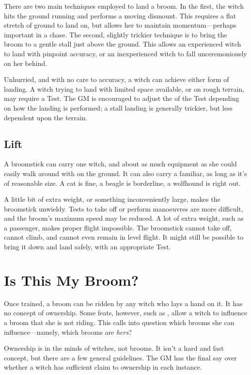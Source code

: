 There are two main techniques employed to land a broom.
In the first, the witch hits the ground running and performs a moving dismount.
This requires a flat stretch of ground to land on, but allows her to maintain momentum---perhaps important in a chase.
The second, slightly trickier technique is to bring the broom to a gentle stall just above the ground.
This allows an experienced witch to land with pinpoint accuracy, or an inexperienced witch to fall unceremoniously on her behind.

Unhurried, and with no care to accuracy, a witch can achieve either form of landing.
A witch trying to land with limited space available, or on rough terrain, may require a Test.
The GM is encouraged to adjust the {\tn} of the Test depending on how the landing is performed; a stall landing is generally trickier, but less dependent upon the terrain.

\subsection{Lift}

A broomstick can carry one witch, and about as much equipment as she could easily walk around with on the ground.
It can also carry a familiar, as long as it's of reasonable size.
A cat is fine, a beagle is borderline, a wolfhound is right out.

A little bit of extra weight, or something inconveniently large, makes the broomstick unwieldy.
Tests to take off or perform manoeuvres are more difficult, and the broom's maximum speed may be reduced.
A lot of extra weight, such as a passenger, makes proper flight impossible.
The broomstick cannot take off, cannot climb, and cannot even remain in level flight.
It might still be possible to bring it down and land safely, with an appropriate Test.



\section{Is This My Broom?}

Once trained, a broom can be ridden by any witch who lays a hand on it.
It has no concept of ownership.
Some feats, however, such as , allow a witch to influence a broom that she is not riding.
This calls into question which brooms she can influence---namely, which brooms are \emph{hers}?

Ownership is in the minds of witches, not brooms.
It isn't a hard and fast concept, but there are a few general guidelines.
The GM has the final say over whether a witch has sufficient claim to ownership in each instance.

